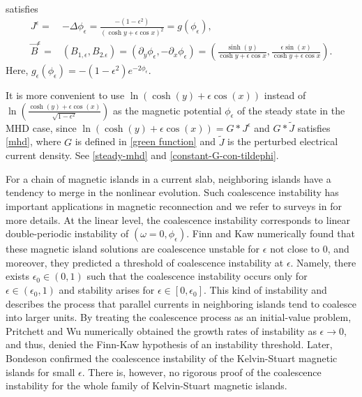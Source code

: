 \documentclass[1 [leqno, 11pt]{amsart}
\numberwithin{equation}{section}
\let\ep=\epsilon
\begin{document}
\begin{CJK*}{GBK}{song}
\begin{align}
 \end{align}
satisfies
 \begin{align*}
J^\epsilon =& -\Delta \phi_\epsilon = \frac{-(1- \epsilon^2 )}{(\cosh y + \epsilon\cos x)^2} =g(\phi_\epsilon),
\\
\vec{B}^\epsilon =& (B_{1,{\ep}},B_{2.{\ep}})= (\partial_y\phi_{\epsilon }, -\partial_x\phi_{\epsilon })= \left(\frac{\sinh(y)}{\cosh y + \epsilon\cos x}, \frac{\epsilon\sin(x)}{\cosh y + \epsilon\cos x}\right).
\end{align*}
Here, $g_\ep(\phi_\epsilon)=-(1-\ep^2) e^{-2\phi_\epsilon}$.

It is more convenient to use $\ln \left(\cosh (y) + \epsilon \cos (x) \right)$ instead of $\ln \left(\frac{\cosh (y) + \epsilon \cos (x)}{\sqrt{1-\epsilon^2}} \right)$ as the  magnetic potential $\phi_\ep$ of the steady state in the MHD case, since $\ln \left(\cosh (y) + \epsilon \cos (x) \right)=G*J^{\ep}$ and $G*\tilde J$ satisfies \eqref{mhd}, where $G$ is defined in \eqref{green function} and $\tilde J$ is the perturbed electrical current density.  See \eqref{steady-mhd} and \eqref{constant-G-con-tildephi}.
\fi

For a chain of magnetic islands  in a current slab, neighboring islands have a tendency to merge in the nonlinear evolution. Such coalescence instability has important applications in magnetic reconnection and we refer to surveys in \cite{Pontin-Priest2022,Priest1985,Priest-Forbes2000} for more details. At the linear level, the coalescence instability corresponds to linear double-periodic instability of $(\omega=0,\phi_{\ep})$.
Finn and Kaw \cite{Finn-Kaw1977} numerically found that these magnetic island solutions are coalescence unstable for $\ep$ not close to $0$, and moreover, they predicted a threshold of  coalescence instability at $\ep$. Namely, there exists $\ep_0\in(0,1)$ such that the coalescence instability occurs only for $\ep\in(\ep_0,1)$ and stability arises for $\ep\in[0,\ep_0]$.
This kind of instability   and describes the process that parallel currents in neighboring islands tend to coalesce into larger units.
\fi
By treating the coalescence process as an initial-value problem, Pritchett and Wu \cite{Pritchett-Wu1979}  numerically   obtained the  growth rates of instability as $\ep\to0$, and thus, denied the Finn-Kaw hypothesis of an instability  threshold. Later, Bondeson  \cite{Bondeson1983} confirmed the coalescence instability of the  Kelvin-Stuart magnetic islands for small $\ep$.
There is, however, no rigorous proof of the  coalescence instability for the whole family of Kelvin-Stuart magnetic islands.


\end{CJK*}
\end{document}
